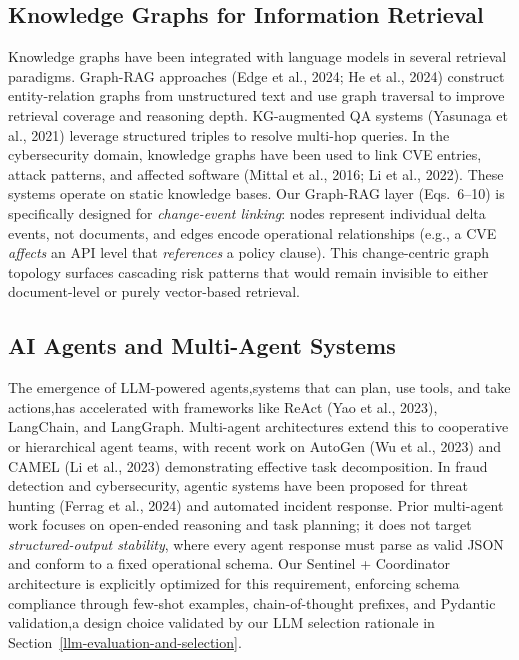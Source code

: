 \documentclass[
]{article}
\begin{document}
\subsection{Knowledge Graphs for Information
Retrieval}\label{knowledge-graphs-for-information-retrieval}

Knowledge graphs have been integrated with language models in several
retrieval paradigms. Graph-RAG approaches (Edge et al., 2024; He et al.,
2024) construct entity-relation graphs from unstructured text and use
graph traversal to improve retrieval coverage and reasoning depth.
KG-augmented QA systems (Yasunaga et al., 2021) leverage structured
triples to resolve multi-hop queries. In the cybersecurity domain,
knowledge graphs have been used to link CVE entries, attack patterns,
and affected software (Mittal et al., 2016; Li et al., 2022). These
systems operate on static knowledge bases. Our Graph-RAG layer
(Eqs.~6--10) is specifically designed for \emph{change-event linking}:
nodes represent individual delta events, not documents, and edges encode
operational relationships (e.g., a CVE \emph{affects} an API level that
\emph{references} a policy clause). This change-centric graph topology
surfaces cascading risk patterns that would remain invisible to either
document-level or purely vector-based retrieval.

\subsection{AI Agents and Multi-Agent
Systems}\label{ai-agents-and-multi-agent-systems}

The emergence of LLM-powered agents,systems that can plan, use tools,
and take actions,has accelerated with frameworks like ReAct (Yao et
al., 2023), LangChain, and LangGraph. Multi-agent architectures extend
this to cooperative or hierarchical agent teams, with recent work on
AutoGen (Wu et al., 2023) and CAMEL (Li et al., 2023) demonstrating
effective task decomposition. In fraud detection and cybersecurity,
agentic systems have been proposed for threat hunting (Ferrag et al.,
2024) and automated incident response. Prior multi-agent work focuses on
open-ended reasoning and task planning; it does not target
\emph{structured-output stability}, where every agent response must
parse as valid JSON and conform to a fixed operational schema. Our
Sentinel + Coordinator architecture is explicitly optimized for this
requirement, enforcing schema compliance through few-shot examples,
chain-of-thought prefixes, and Pydantic validation,a design choice
validated by our LLM selection rationale in Section~\ref{llm-evaluation-and-selection}.
\end{document}
